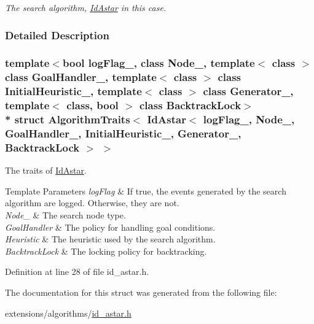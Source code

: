 \begin{DoxyCompactItemize}
\begin{DoxyCompactList}\small\item\em The search algorithm, \hyperlink{structIdAstar}{Id\+Astar} in this case. \end{DoxyCompactList}\end{DoxyCompactItemize}


\subsubsection{Detailed Description}
\subsubsection*{template$<$bool log\+Flag\+\_\+, class Node\+\_\+, template$<$ class $>$ class Goal\+Handler\+\_\+, template$<$ class $>$ class Initial\+Heuristic\+\_\+, template$<$ class $>$ class Generator\+\_\+, template$<$ class, bool $>$ class Backtrack\+Lock$>$\\*
struct Algorithm\+Traits$<$ Id\+Astar$<$ log\+Flag\+\_\+, Node\+\_\+, Goal\+Handler\+\_\+, Initial\+Heuristic\+\_\+, Generator\+\_\+, Backtrack\+Lock $>$ $>$}

The traits of \hyperlink{structIdAstar}{Id\+Astar}. 


\begin{DoxyTemplParams}{Template Parameters}
{\em log\+Flag} & If {\ttfamily true}, the events generated by the search algorithm are logged. Otherwise, they are not. \\
\hline
{\em Node\+\_\+} & The search node type. \\
\hline
{\em Goal\+Handler} & The policy for handling goal conditions. \\
\hline
{\em Heuristic} & The heuristic used by the search algorithm. \\
\hline
{\em Backtrack\+Lock} & The locking policy for backtracking. \\
\hline
\end{DoxyTemplParams}


Definition at line 28 of file id\+\_\+astar.\+h.



The documentation for this struct was generated from the following file\+:\begin{DoxyCompactItemize}
\item 
extensions/algorithms/\hyperlink{id__astar_8h}{id\+\_\+astar.\+h}\end{DoxyCompactItemize}
